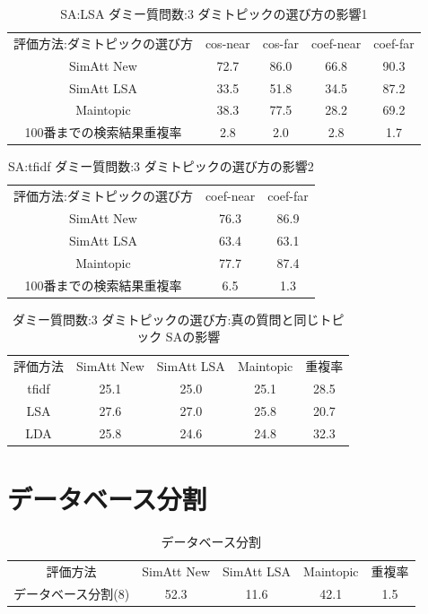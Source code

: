 \documentclass[master]{suribt}
\theoremstyle{definition}
\begin{document}
 \begin{table}[!hbp]
 \center
 \begin{tabular}{|c|c|c|c|c|}
 \hline
 評価方法:ダミトピックの選び方 & cos-near & cos-far & coef-near & coef-far \\
 SimAtt New & 72.7 & 86.0 & 66.8 & 90.3 \\
 SimAtt LSA & 33.5 & 51.8 & 34.5 & 87.2 \\
 Maintopic &  38.3 & 77.5 & 28.2 & 69.2 \\
 100番までの検索結果重複率 & 2.8 & 2.0 & 2.8 & 1.7 \\
 \hline
 \end{tabular}
 \caption{SA:LSA ダミー質問数:3  ダミトピックの選び方の影響1}
 \end{table}

 \begin{table}[!hbp]
 \center
 \begin{tabular}{|c|c|c|}
 \hline
 評価方法:ダミトピックの選び方 & coef-near & coef-far \\
 SimAtt New & 76.3 & 86.9 \\
 SimAtt LSA & 63.4 & 63.1 \\
 Maintopic  & 77.7 & 87.4 \\
 100番までの検索結果重複率 & 6.5 & 1.3 \\
 \hline
 \end{tabular}
 \caption{SA:tfidf ダミー質問数:3  ダミトピックの選び方の影響2}
 \end{table}

 \begin{table}[!hbp]
 \center
 \begin{tabular}{|c|c|c|c|c|}
 \hline
 評価方法  & SimAtt New & SimAtt LSA  & Maintopic & 重複率  \\
 tfidf  & 25.1 & 25.0 & 25.1 & 28.5 \\
 LSA  & 27.6 & 27.0 & 25.8 & 20.7 \\
 LDA  & 25.8 & 24.6 & 24.8 & 32.3 \\
 \hline
 \end{tabular}
 \caption{ダミー質問数:3  ダミトピックの選び方:真の質問と同じトピック SAの影響}
 \end{table}



 \section{データベース分割}

 \begin{table}[!hbp]
 \center
 \begin{tabular}{|c|c|c|c|c|}
 \hline
 評価方法  & SimAtt New & SimAtt LSA  & Maintopic & 重複率  \\
 データベース分割(8)  & 52.3 & 11.6 & 42.1 & 1.5 \\
 \hline
 \end{tabular}
 \caption{データベース分割}
 \end{table}
\end{document}
